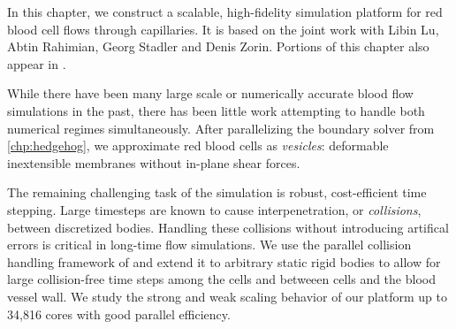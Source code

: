 In this chapter, we construct a scalable, high-fidelity simulation platform for red blood cell flows through capillaries.
It is based on the joint work \cite{lu2019scalable} with Libin Lu, Abtin Rahimian, Georg Stadler and Denis Zorin.
Portions of this chapter also appear in \cite{lu2019parallel}.

While there have been many large scale or numerically accurate blood flow simulations in the past, there has been little work attempting to handle both numerical regimes simultaneously.
After parallelizing the boundary solver from \cref{chp:hedgehog}, we approximate red blood cells as \textit{vesicles}: deformable inextensible membranes without in-plane shear forces.

The remaining challenging task of the simulation is robust, cost-efficient time stepping.
Large timesteps are known to cause interpenetration, or \textit{collisions}, between discretized bodies.
Handling these collisions without introducing artifical errors is critical in long-time flow simulations.
We use the parallel collision handling framework of \cite{lu2018parallel} and extend it to arbitrary static rigid bodies to allow for large collision-free time steps among the cells and betweeen cells and the blood vessel wall.
We study the strong and weak scaling behavior of our platform up to 34,816 cores with good parallel efficiency.








